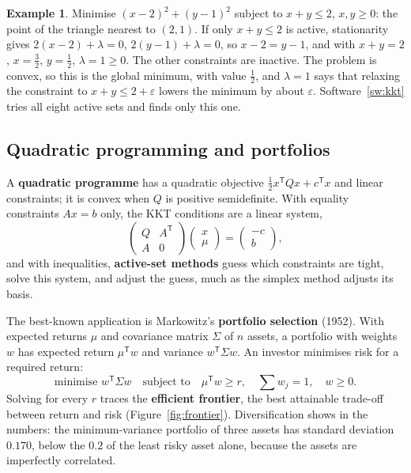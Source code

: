\documentclass[11pt,a4paper]{article}
\numberwithin{equation}{section}
\theoremstyle{definition}
\newtheorem{exa}[thm]{Example}
\begin{document}
\begin{exa}
\label{ex:kkt}
Minimise $(x - 2)^2 + (y - 1)^2$ subject to $x + y \leq 2$, $x, y \geq 0$: the point of the triangle nearest to $(2, 1)$. If only $x + y \leq 2$ is active, stationarity gives $2(x - 2) + \lambda = 0$, $2(y - 1) + \lambda = 0$, so $x - 2 = y - 1$, and with $x + y = 2$, $x = \frac32$, $y = \frac12$,
$\lambda = 1 \geq 0$. The other constraints are inactive. The problem is convex, so this is the global minimum, with value $\frac12$, and $\lambda = 1$ says that relaxing the constraint to $x + y \leq 2 + \varepsilon$ lowers the minimum by about $\varepsilon$. Software~\ref{sw:kkt} tries all eight active sets and finds only this one.
\end{exa}

\subsection{Quadratic programming and portfolios}
\label{ssec:qp}

A \textbf{quadratic programme} has a quadratic objective $\frac12x^{\mathsf T}Qx + c^{\mathsf T}x$ and linear constraints; it is convex when $Q$ is positive semidefinite. With equality constraints $Ax = b$ only, the KKT conditions are a linear system,
\[
\begin{pmatrix} Q & A^{\mathsf T} \\ A & 0 \end{pmatrix}\begin{pmatrix} x \\ \mu \end{pmatrix} = \begin{pmatrix} -c \\ b \end{pmatrix} ,
\]
and with inequalities, \textbf{active-set methods} guess which constraints are tight, solve this system, and adjust the guess, much as the simplex method adjusts its basis.

The best-known application is Markowitz's \textbf{portfolio selection} (1952). With expected returns $\mu$ and covariance matrix $\Sigma$ of $n$ assets, a portfolio with weights $w$ has expected return $\mu^{\mathsf T}w$ and variance $w^{\mathsf T}\Sigma w$. An investor minimises risk for a required return:
\[
\text{minimise } w^{\mathsf T}\Sigma w \quad\text{subject to}\quad \mu^{\mathsf T}w \geq r, \quad \textstyle\sum w_j = 1, \quad w \geq 0 .
\]
Solving for every $r$ traces the \textbf{efficient frontier}, the best attainable trade-off between return and risk (Figure~\ref{fig:frontier}). Diversification shows in the numbers: the minimum-variance portfolio of three assets has standard deviation $0.170$, below the $0.2$ of the least risky asset alone, because the assets are imperfectly
correlated.
\end{document}
